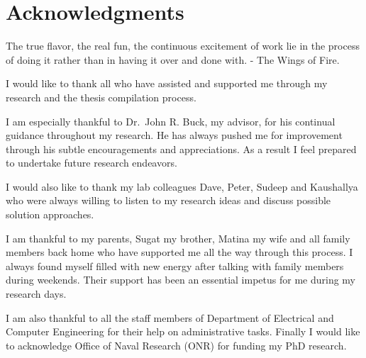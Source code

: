 \doublespacing
\chapter*{Acknowledgments}
The true flavor, the real fun, the continuous excitement of work lie in the process of doing it rather than in having it over and done with. - The Wings of Fire.

I would like to thank all who have assisted and supported me through my research and the thesis compilation process.

I am especially thankful to Dr.~John R. Buck, my advisor, for his continual guidance throughout my research. He has always pushed me for improvement through his subtle encouragements and appreciations. As a result I feel prepared to undertake future research endeavors. 

I would also like to thank my lab colleagues Dave, Peter, Sudeep and Kaushallya who were always willing to listen to my research ideas and discuss possible solution approaches.

I am thankful to my parents, Sugat my brother, Matina my wife and all family members back home who have supported me all the way through this process. I always found myself filled with new energy after talking with family members during weekends. Their support has been an essential impetus for me during my research days.

I am also thankful to all the staff members of Department of Electrical and Computer Engineering for their help on administrative tasks. Finally I would like to acknowledge Office of Naval Research (ONR) for funding my PhD research.

